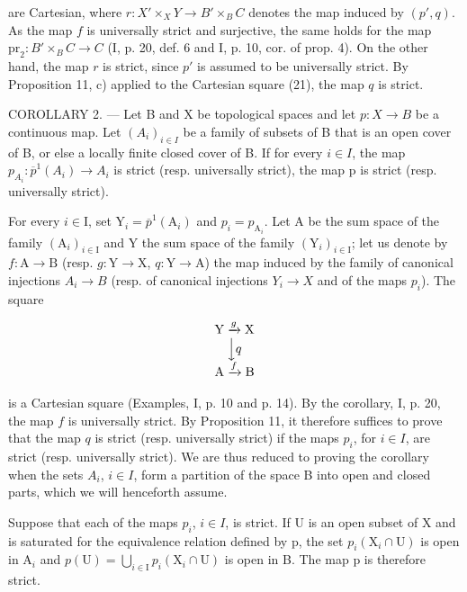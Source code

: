 are Cartesian, where \(r \colon X' \times_{X} Y \to B' \times_{B} C\) denotes the map induced by \((p', q)\). As the map \(f\) is universally strict and surjective, the same holds for the map \(\mathrm{pr}_2 \colon B' \times_{B} C \to C\) (I, p. 20, def. 6 and I, p. 10, cor. of prop. 4). On the other hand, the map \(r\) is strict, since \(p'\) is assumed to be universally strict. By Proposition 11, c) applied to the Cartesian square (21), the map \(q\) is strict.

COROLLARY 2. --- Let B and X be topological spaces and let \(p\colon X \to B\) be a continuous map. Let \((A_i)_{i \in I}\) be a family of subsets of B that is an open cover of B, or else a locally finite closed cover of B. If for every \(i \in I\), the map \(p_{A_i}\colon \overline{p}^1(A_i) \to A_i\) is strict (resp. universally strict), the map p is strict (resp. universally strict).

For every \(i \in \mathrm{I}\), set \(\mathrm{Y}_i = \overline{p}^{1}(\mathrm{A}_i)\) and \(p_i = p_{\mathrm{A}_i}\). Let A be the sum space of the family \((\mathrm{A}_i)_{i \in \mathrm{I}}\) and Y the sum space of the family \((\mathrm{Y}_i)_{i \in \mathrm{I}}\); let us denote by \(f: \mathrm{A} \to \mathrm{B}\) (resp. \(g: \mathrm{Y} \to \mathrm{X}\), \(q: \mathrm{Y} \to \mathrm{A}\)) the map induced by the family of canonical injections \(A_i \rightarrow B\) (resp. of canonical injections \(Y_i \rightarrow X\) and of the maps \(p_i\)). The square

\[
\begin{array}{c} \mathrm{Y} \xrightarrow {g} \mathrm{X} \\ \Big \downarrow q \\ \mathrm{A} \xrightarrow {f} \mathrm{B} \end{array}
\]

is a Cartesian square (Examples, I, p. 10 and p. 14). By the corollary, I, p. 20, the map \(f\) is universally strict. By Proposition 11, it therefore suffices to prove that the map \(q\) is strict (resp. universally strict) if the maps \(p_i\), for \(i \in I\), are strict (resp. universally strict). We are thus reduced to proving the corollary when the sets \(A_i\), \(i \in I\), form a partition of the space B into open and closed parts, which we will henceforth assume.

Suppose that each of the maps \(p_i\), \(i \in I\), is strict. If U is an open subset of X and is saturated for the equivalence relation defined by p, the set \(p_i(\mathrm{X}_i \cap \mathrm{U})\) is open in \(\mathrm{A}_i\) and \(p(\mathrm{U}) = \bigcup_{i \in \mathrm{I}} p_i(\mathrm{X}_i \cap \mathrm{U})\) is open in B. The map p is therefore strict.


